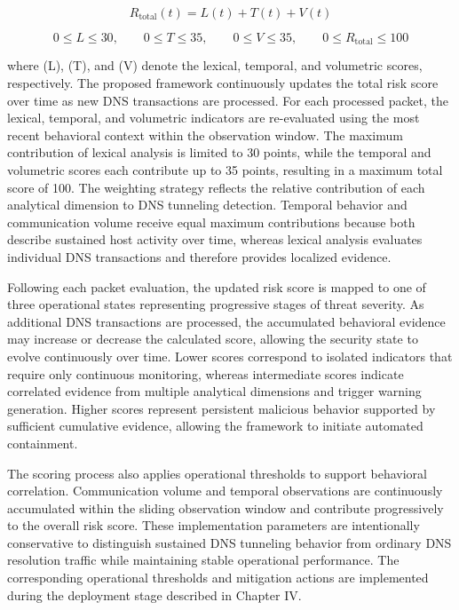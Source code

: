 \documentclass[14pt, a4paper, oneside]{report}
\begin{document}
\begin{equation}
R_{\mathrm{total}}(t)=L(t)+T(t)+V(t)
\end{equation}

\begin{equation}
0 \leq L \leq 30,\qquad
0 \leq T \leq 35,\qquad
0 \leq V \leq 35,\qquad
0 \leq R_{\mathrm{total}} \leq 100
\end{equation}

where (L), (T), and (V) denote the lexical, temporal, and volumetric scores, respectively. 
The proposed framework continuously updates the total risk score over time as new DNS transactions are processed. For each processed packet, the lexical, temporal, and volumetric indicators are re-evaluated using the most recent behavioral context within the observation window. The maximum contribution of lexical analysis is limited to 30 points, while the temporal and volumetric scores each contribute up to 35 points, resulting in a maximum total score of 100. The weighting strategy reflects the relative contribution of each analytical dimension to DNS tunneling detection. Temporal behavior and communication volume receive equal maximum contributions because both describe sustained host activity over time, whereas lexical analysis evaluates individual DNS transactions and therefore provides localized evidence.

Following each packet evaluation, the updated risk score is mapped to one of three operational states representing progressive stages of threat severity. As additional DNS transactions are processed, the accumulated behavioral evidence may increase or decrease the calculated score, allowing the security state to evolve continuously over time. Lower scores correspond to isolated indicators that require only continuous monitoring, whereas intermediate scores indicate correlated evidence from multiple analytical dimensions and trigger warning generation. Higher scores represent persistent malicious behavior supported by sufficient cumulative evidence, allowing the framework to initiate automated containment.

The scoring process also applies operational thresholds to support behavioral correlation. Communication volume and temporal observations are continuously accumulated within the sliding observation window and contribute progressively to the overall risk score. These implementation parameters are intentionally conservative to distinguish sustained DNS tunneling behavior from ordinary DNS resolution traffic while maintaining stable operational performance. The corresponding operational thresholds and mitigation actions are implemented during the deployment stage described in Chapter IV.
\end{document}
